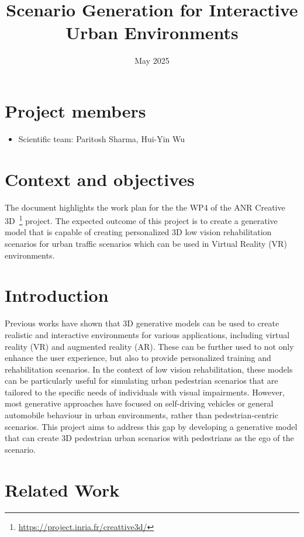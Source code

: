 \documentclass{article}
\title{Scenario Generation for Interactive Urban Environments}
\date{May 2025}
\begin{document}
\maketitle

\section*{Project members}

\begin{itemize}
    \item Scientific team: Paritosh Sharma, Hui-Yin Wu
\end{itemize}

\section{Context and objectives}

The document highlights the work plan for the the WP4 of the ANR Creative 3D~\footnote{\url{https://project.inria.fr/creattive3d/}} project. The expected outcome of this project is to create a generative model that is capable of creating personalized 3D low vision rehabilitation scenarios for urban traffic scenarios which can be used in Virtual Reality (VR) environments.

\section{Introduction}

Previous works have shown that 3D generative models can be used to create realistic and interactive environments for various applications, including virtual reality (VR) and augmented reality (AR). These can be further used to not only enhance the user experience, but also to provide personalized training and rehabilitation scenarios. In the context of low vision rehabilitation, these models can be particularly useful for simulating urban pedestrian scenarios that are tailored to the specific needs of individuals with visual impairments. However, most generative approaches have focused on self-driving vehicles or general automobile behaviour in urban environments, rather than pedestrian-centric scenarios. This project aims to address this gap by developing a generative model that can create 3D pedestrian urban scenarios with pedestrians as the ego of the scenario.

\section{Related Work}
\end{document}
